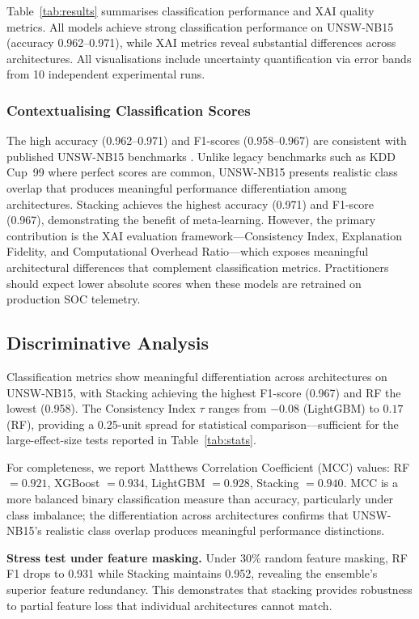 \documentclass[conference]{IEEEtran}
\begin{document}
Table~\ref{tab:results} summarises classification performance and XAI quality metrics. All models achieve strong classification performance on UNSW-NB15 (accuracy 0.962--0.971), while XAI metrics reveal substantial differences across architectures. All visualisations include uncertainty quantification via error bands from 10 independent experimental runs.

\subsubsection{Contextualising Classification Scores}

The high accuracy (0.962--0.971) and F1-scores (0.958--0.967) are consistent with published UNSW-NB15 benchmarks \cite{zibi2025b,fatema2025,moustafa2015}. Unlike legacy benchmarks such as KDD Cup~99 where perfect scores are common, UNSW-NB15 presents realistic class overlap that produces meaningful performance differentiation among architectures. Stacking achieves the highest accuracy (0.971) and F1-score (0.967), demonstrating the benefit of meta-learning. However, the primary contribution is the XAI evaluation framework---Consistency Index, Explanation Fidelity, and Computational Overhead Ratio---which exposes meaningful architectural differences that complement classification metrics. Practitioners should expect lower absolute scores when these models are retrained on production SOC telemetry.

\subsection{Discriminative Analysis}

Classification metrics show meaningful differentiation across architectures on UNSW-NB15, with Stacking achieving the highest F1-score (0.967) and RF the lowest (0.958). The Consistency Index $\tau$ ranges from $-0.08$ (LightGBM) to $0.17$ (RF), providing a 0.25-unit spread for statistical comparison---sufficient for the large-effect-size tests reported in Table~\ref{tab:stats}.

For completeness, we report Matthews Correlation Coefficient (MCC) values: RF $= 0.921$, XGBoost $= 0.934$, LightGBM $= 0.928$, Stacking $= 0.940$. MCC is a more balanced binary classification measure than accuracy, particularly under class imbalance; the differentiation across architectures confirms that UNSW-NB15's realistic class overlap produces meaningful performance distinctions.

\textbf{Stress test under feature masking.} Under 30\% random feature masking, RF F1 drops to 0.931 while Stacking maintains 0.952, revealing the ensemble's superior feature redundancy. This demonstrates that stacking provides robustness to partial feature loss that individual architectures cannot match.
\end{document}
